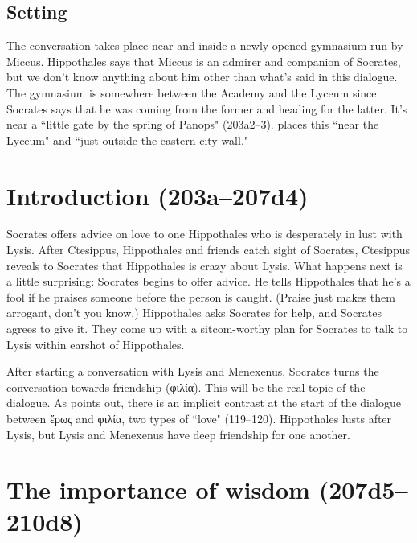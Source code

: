 \documentclass[11pt]{article}
\begin{document}
\subsection{Setting}

The conversation takes place near and inside a newly opened gymnasium run
by Miccus.  Hippothales says that Miccus is an admirer and companion of
Socrates, but we don't know anything about him other than what's said in
this dialogue.  The gymnasium is somewhere between the Academy and the
Lyceum since Socrates says that he was coming from the former and heading
for the latter.  It's near a ``little gate by the spring of Panops"
(203a2--3).  \citet{race1983} places this ``near the Lyceum" and ``just
outside the eastern city wall."



\section{Introduction (203a--207d4)}

Socrates offers advice on love to one Hippothales who is desperately in
lust with Lysis.  After Ctesippus, Hippothales and friends catch sight of
Socrates, Ctesippus reveals to Socrates that Hippothales is crazy about
Lysis.  What happens next is a little surprising: Socrates begins to offer
advice.  He tells Hippothales that he's a fool if he praises someone before
the person is caught.  (Praise just makes them arrogant, don't you know.)
Hippothales asks Socrates for help, and Socrates agrees to give it.  They
come up with a sitcom-worthy plan for Socrates to talk to Lysis within
earshot of Hippothales.

After starting a conversation with Lysis and Menexenus, Socrates turns the
conversation towards friendship ({\g φιλία}).  This will be the real topic
of the dialogue.  As \citet{watt1987} points out, there is an implicit
contrast at the start of the dialogue between {\g ἔρως} and {\g φιλία}, two
types of ``love" (119--120).  Hippothales lusts after Lysis, but Lysis and
Menexenus have deep friendship for one another.


\section{The importance of wisdom (207d5--210d8)}
\end{document}

